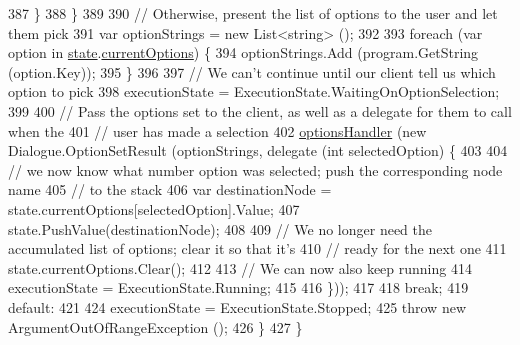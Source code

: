 \begin{DoxyCode}
387                     \}
388                 \}
389 
390                 \textcolor{comment}{// Otherwise, present the list of options to the user and let them pick}
391                 var optionStrings = \textcolor{keyword}{new} List<string> ();
392 
393                 \textcolor{keywordflow}{foreach} (var option \textcolor{keywordflow}{in} \hyperlink{a00156_a70f2ce6201cdd2430ceaa764ac614ca0}{state}.\hyperlink{a00159_ab816dfea32ecda23282700f01454e0a9}{currentOptions}) \{
394                     optionStrings.Add (program.GetString (option.Key));
395                 \}
396 
397                 \textcolor{comment}{// We can't continue until our client tell us which option to pick}
398                 executionState = ExecutionState.WaitingOnOptionSelection;
399 
400                 \textcolor{comment}{// Pass the options set to the client, as well as a delegate for them to call when the}
401                 \textcolor{comment}{// user has made a selection}
402                 \hyperlink{a00156_acd25fe2e3aa90dc87ba25d9af904465b}{optionsHandler} (\textcolor{keyword}{new} Dialogue.OptionSetResult (optionStrings, delegate (\textcolor{keywordtype}{int} 
      selectedOption) \{
403 
404                     \textcolor{comment}{// we now know what number option was selected; push the corresponding node name}
405                     \textcolor{comment}{// to the stack}
406                     var destinationNode = state.currentOptions[selectedOption].Value;
407                     state.PushValue(destinationNode);
408 
409                     \textcolor{comment}{// We no longer need the accumulated list of options; clear it so that it's}
410                     \textcolor{comment}{// ready for the next one}
411                     state.currentOptions.Clear();
412 
413                     \textcolor{comment}{// We can now also keep running}
414                     executionState = ExecutionState.Running;
415 
416                 \}));
417 
418                 \textcolor{keywordflow}{break};
419             \textcolor{keywordflow}{default}:
421 
424                 executionState = ExecutionState.Stopped;
425                 \textcolor{keywordflow}{throw} \textcolor{keyword}{new} ArgumentOutOfRangeException ();
426             \}
427         \}
\end{DoxyCode}


